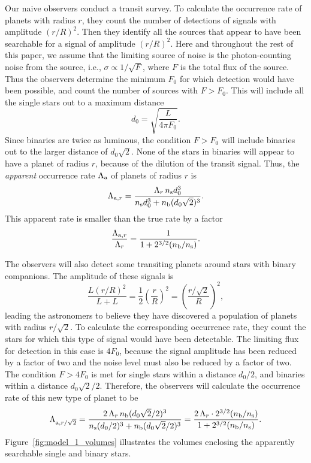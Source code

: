 \documentclass[12pt,modern]{aastex61}
\renewcommand{\a}{_{\rm a}}
\newcommand{\s}{_{\rm s}}
\renewcommand{\b}{_{\rm b}}
\begin{document}
Our naive observers conduct a transit survey. To calculate the
occurrence rate of planets with radius $r$, they count the number of
detections of signals with amplitude $(r/R)^2$.  Then they identify
all the sources that appear to have been searchable for a signal of
amplitude $(r/R)^2$.  Here and throughout the rest of this paper, we
assume that the limiting source of noise is the photon-counting noise
from the source, i.e., $\sigma \propto 1/\sqrt{F}$, where $F$ is the
total flux of the source.  Thus the observers determine the minimum
$F_0$ for which detection would have been possible, and count the
number of sources with $F>F_0$. This will include all the single stars
out to a maximum distance
\begin{equation}
  d_0 = \sqrt{\frac{L}{4\pi F_0}}.
  \label{eq:dmax}
\end{equation}
Since binaries are twice as luminous, the condition $F>F_0$ will
include binaries out to the larger distance of $d_0\sqrt{2}$.  None of
the stars in binaries will appear to have a planet of radius $r$,
because of the dilution of the transit signal.  Thus, the {\it
apparent} occurrence rate $\Lambda\a$ of planets of radius $r$ is
\begin{equation}
    \Lambda_{{\rm{a}},r} = 
        \frac{\Lambda_r \, n\s d_0^3}
        {n\s d_0^3 + n\b (d_0\sqrt{2})^3}.
    \label{eq:rate_at_rp}
\end{equation}
This apparent rate is smaller than the true rate by a factor
\begin{equation}
    \frac{\Lambda_{{\rm{a}},r}}{\Lambda_r} = 
        \frac{1}{1 + 2^{3/2}(n\b/n\s)}.
    \label{eq:correction_rp}
\end{equation}

The observers will also detect some transiting planets around stars
with binary companions.  The amplitude of these signals is
\begin{equation}
  \frac{L(r/R)^2}{L + L} = \frac{1}{2}\left(\frac{r}{R}\right)^2 =
  \left(\frac{r/\sqrt{2}}{R}\right)^2,
    \label{eq:delta_obs_general} 
\end{equation}
leading the astronomers to believe they have discovered a population
of planets with radius $r/\sqrt{2}$.  To calculate the corresponding
occurrence rate, they count the stars for which this type of signal
would have been detectable.  The limiting flux for detection in this
case is $4F_0$, because the signal amplitude has been reduced by a
factor of two and the noise level must also be reduced by a factor of
two.  The condition $F>4F_0$ is met for single stars within a distance
$d_0/2$, and binaries within a distance $d_0\sqrt{2}/2$.  Therefore,
the observers will calculate the occurrence rate of this new type of
planet to be
\begin{equation}
    \Lambda_{{\rm{a}},r/\sqrt{2}} = 
        \frac{2\, \Lambda_r \, n\b (d_0\sqrt{2}/2)^3}
        {n\s (d_0/2)^3 + n\b (d_0\sqrt{2}/2)^3}
    =
    \frac{2\, \Lambda_r \cdot2^{3/2}(n\b/n\s)}{1 + 2^{3/2} (n\b/n\s)}.
    \label{eq:correction_diluted_rp}
\end{equation}
Figure~\ref{fig:model_1_volumes} illustrates the
volumes enclosing the apparently searchable single and binary stars.
\end{document}
